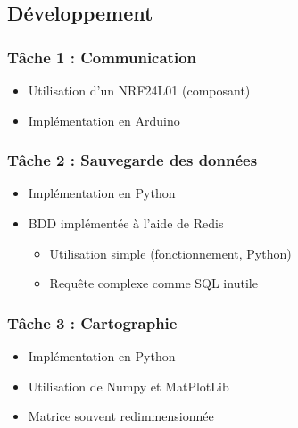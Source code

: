 \documentclass{beamer}
\begin{document}
{      %
      \subsection{Développement}
	\begin{frame} %
	  \frametitle{Tâche 1 : Communication}
	  
	  \begin{itemize}
	    \item Utilisation d'un NRF24L01 (composant)
	    \item Implémentation en Arduino
	  \end{itemize}
	\end{frame}
	
	\begin{frame} %
	  \frametitle{Tâche 2 : Sauvegarde des données}
	  
	  \begin{itemize}
	    \item Implémentation en Python
	    \item BDD implémentée à l'aide de Redis
	    \begin{itemize}
	      \item Utilisation simple (fonctionnement, Python)
	      \item Requête complexe comme SQL inutile
	    \end{itemize}
	  \end{itemize}
	\end{frame}
	
	\begin{frame} %
	  \frametitle{Tâche 3 : Cartographie}
	  
	  \begin{itemize}
	    \item Implémentation en Python
	    \item Utilisation de Numpy et MatPlotLib
	    \item Matrice souvent redimmensionnée
	  \end{itemize}
	\end{frame}
	
}
\end{document}
